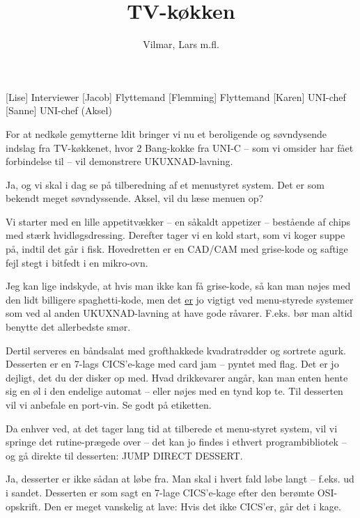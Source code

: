 \documentclass[a4paper,11pt]{article}
\title{TV-køkken}
\author{Vilmar, Lars m.fl.}
\begin{document}
\maketitle

\begin{roles}
[Lise] Interviewer
[Jacob] Flyttemand
[Flemming] Flyttemand
[Karen] UNI-chef
[Sanne] UNI-chef (Aksel)
\end{roles}

\begin{sketch}


 For at nedkøle gemytterne ldit bringer vi nu et beroligende og
søvndysende indslag fra TV-køkkenet, hvor 2 Bang-kokke fra UNI-C -- som vi
omsider har fået forbindelse til -- vil demonstrere UKUXNAD-lavning.

 Ja, og vi skal i dag se på tilberedning af et menustyret system.  Det
er som bekendt meget søvndyssende. Aksel, vil du læse menuen op?

 Vi starter med en lille appetitvækker -- en såkaldt appetizer --
bestående af chips med stærk hvidløgsdressing.  Derefter tager vi en kold start,
som vi koger suppe på, indtil det går i fisk.  Hovedretten er en CAD/CAM med
grise-kode og saftige fejl stegt i bitfedt i en mikro-ovn.

 Jeg kan lige indskyde, at hvis man ikke kan få grise-kode, så kan man
nøjes med den lidt billigere spaghetti-kode, men det \underline{er} jo vigtigt
ved menu-styrede systemer som ved al anden UKUXNAD-lavning at have gode
råvarer.  F.eks. bør man altid benytte det allerbedste smør.

 Dertil serveres en båndsalat med grofthakkede kvadratrødder og
sortrete agurk.  Desserten er en 7-lags CICS'e-kage med card jam -- pyntet med
flag.
 Det er jo dejligt, det du der disker op med. Hvad drikkevarer angår,
kan man enten hente sig en øl i den endelige automat -- eller nøjes med en tynd
kop te.  Til desserten vil vi anbefale en port-vin. Se godt på etiketten.

 Da enhver ved, at det tager lang tid at tilberede et menu-styret
system, vil vi springe det rutine-prægede over -- det kan jo findes i ethvert
programbibliotek -- og gå direkte til desserten: JUMP DIRECT DESSERT.

 Ja, desserter er ikke sådan at løbe fra. Man skal i hvert fald løbe
langt -- f.eks. ud i sandet.  Desserten er som sagt en 7-lage CICS'e-kage efter
den berømte OSI-opskrift.  Den er meget vanskelig at lave: Hvis det ikke
CICS'er, går det i kage.


\end{sketch}
\end{document}

